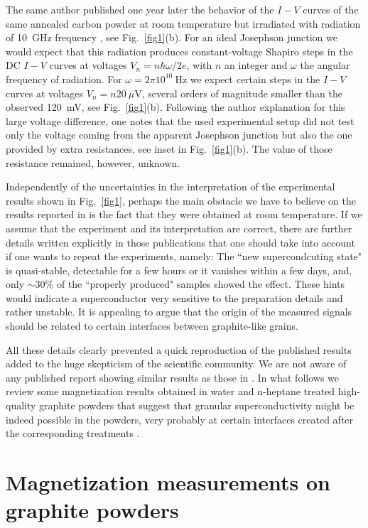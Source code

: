 \documentclass[aps,dvipsnames,twocolumn,floatfix,amsmath]{revtex4-1}
\begin{document}
The same author published one year later the behavior of the $I-V$
curves of the same annealed carbon powder at room temperature but
irradiated with radiation of 10~GHz frequency \cite{ant75}, see
Fig.~\ref{fig1}(b). For an ideal Josephson junction we would
expect that this radiation produces constant-voltage Shapiro steps
\cite{sha63} in the DC $I-V$ curves at voltages $V_n = n \hbar
\omega/2e$, with $n$ an integer and $\omega$ the angular frequency
of radiation. For $\omega = 2 \pi 10^{10}~$Hz we expect certain
steps in the $I-V$ curves at voltages $V_n = n 20~\mu$V, several
orders of magnitude smaller than the observed 120~mV, see
Fig.~\ref{fig1}(b). Following the author explanation for this
large voltage difference, one notes that the used experimental
setup
 did not test only the voltage coming from the apparent
Josephson junction but also the one provided by extra resistances,
see inset in Fig.~\ref{fig1}(b). The value of those resistance remained, however, unknown.

Independently of the uncertainties in the interpretation of the
experimental results shown in Fig.~\ref{fig1}, perhaps the main
obstacle we have to believe on the results reported in
\cite{ant74,ant75} is the fact that they were obtained at room
temperature. If we assume that the experiment and its
interpretation are correct, there are further details written
explicitly in those publications \cite{ant74,ant75} that one
should take into account if one wants to repeat  the
experiments, namely: The ``new supercondcuting state" is quasi-stable, detectable
for a few hours or it vanishes within a few days, and, only $\sim
30\%$ of the ``properly produced" samples showed the effect.
These hints  would indicate a superconductor very sensitive to the preparation details and rather unstable.
It is appealing to argue that the origin of the measured signals should be related to
certain interfaces between graphite-like  grains.

All these details clearly prevented a quick reproduction of the
published results added to the huge skepticism of the scientific
community. We are not aware of any published report showing
similar results as those  in \cite{ant74,ant75}. In what follows
we review some magnetization results obtained in water and
n-heptane treated high-quality graphite powders that suggest that
granular superconductivity might be indeed possible  in  the
powders, very probably at certain interfaces created after the
corresponding treatments \cite{sch12,schcar}.

\section{Magnetization measurements on graphite powders}
\label{powder}
\end{document}
